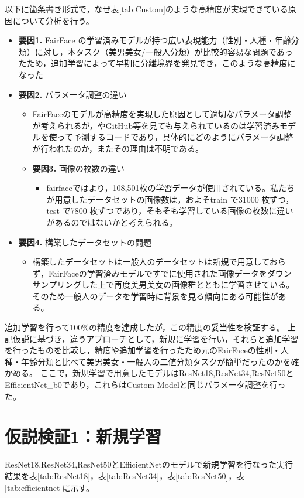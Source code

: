 \documentclass[a4paper,11pt,titlepage]{jsarticle}
\begin{document}
以下に箇条書き形式で，なぜ表\ref{tab:Custom}のような高精度が実現できている原因について分析を行う。
\begin{itemize}	
	\item \textbf{要因1.} FairFace の学習済みモデルが持つ広い表現能力（性別・人種・年齢分類）に対し，本タスク（美男美女/一般人分類）が比較的容易な問題であったため，追加学習によって早期に分離境界を発見でき，このような高精度になった
	\item \textbf{要因2.} パラメータ調整の違い
	\begin{itemize}
		\item FairFaceのモデルが高精度を実現した原因として適切なパラメータ調整が考えられるが，\cite{karkkainenFairFace}やGitHub等を見ても与えられているのは学習済みモデルを使って予測するコードであり，具体的にどのようにパラメータ調整が行われたのか，またその理由は不明である。
	\item \textbf{要因3.} 画像の枚数の違い
	\begin{itemize}
		\item fairfaceでは\cite{karkkainenFairFace}より，108,501枚の学習データが使用されている。私たちが用意したデータセットの画像数は，およそtrain で31000 枚ずつ，test で7800 枚ずつであり，そもそも学習している画像の枚数に違いがあるのではないかと考えられる。
	\end{itemize}
	\end{itemize}
	\item \textbf{要因4.} 構築したデータセットの問題
	\begin{itemize}
		\item 構築したデータセットは一般人のデータセットは新規で用意しておらず，FairFaceの学習済みモデルですでに使用された画像データをダウンサンプリングした上で再度美男美女の画像群とともに学習させている。そのため一般人のデータを学習時に背景を見る傾向にある可能性がある。
	\end{itemize}
\end{itemize}

追加学習を行って100\%の精度を達成したが，この精度の妥当性を検証する。
上記仮説に基づき，違うアプローチとして，新規に学習を行い，それらと追加学習を行ったものを比較し，精度や追加学習を行ったため元のFairFaceの性別・人種・年齢分類と比べて美男美女・一般人の二値分類タスクが簡単だったのかを確かめる。
ここで，新規学習で用意したモデルはResNet18,ResNet34,ResNet50とEfficientNet\_b0であり，これらはCustom Modelと同じパラメータ調整を行った。


\section{仮説検証1：新規学習}
ResNet18,ResNet34,ResNet50とEfficientNetのモデルで新規学習を行なった実行結果を表\ref{tab:ResNet18}，表\ref{tab:ResNet34}，表\ref{tab:ResNet50}，表\ref{tab:efficientnet}に示す。
\end{document}
